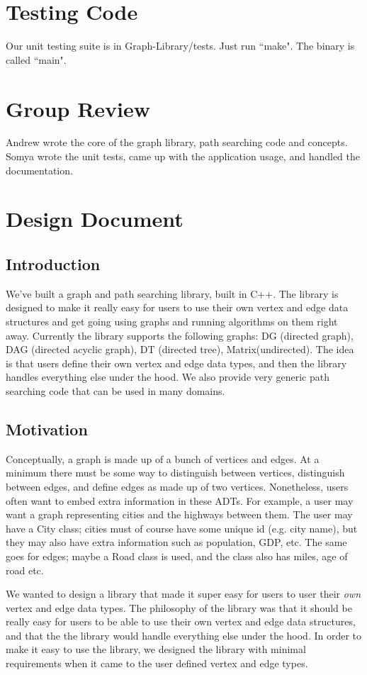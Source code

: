 \documentclass{article}
\begin{document}
\section{Testing Code}
Our unit testing suite is in Graph-Library/tests. Just run ``make". The binary is called ``main".

\section{Group Review}
Andrew wrote the core of the graph library, path searching code and concepts. Somya wrote the unit tests, came up with the application usage, and handled the documentation.

\section{Design Document}

\subsection{Introduction}
We've built a graph and path searching library, built in C++. The library is designed to make it really easy for users to use their own vertex and edge data structures and get going using graphs and running algorithms on them right away. Currently the library supports the following graphs: DG (directed graph), DAG (directed acyclic graph), DT (directed tree), Matrix(undirected). The idea is that users define their own vertex and edge data types, and then the library handles everything else under the hood. We also provide very generic path searching code that can be used in many domains. 

\subsection{Motivation}
Conceptually, a graph is made up of a bunch of vertices and edges. At a minimum there must be some way to distinguish between vertices, distinguish between edges, and define edges as made up of two vertices. Nonetheless, users often want to embed extra information in these ADTs. For example, a user may want a graph representing cities and the highways between them. The user may have a City class; cities must of course have some unique id (e.g. city name), but they may also have extra information such as population, GDP, etc. The same goes for edges; maybe a Road class is used, and the class also has miles, age of road etc. 
\par
We wanted to design a library that made it super easy for users to user their \emph{own} vertex and edge data types.
The philosophy of the library was that it should be really easy for users to be able to use their own vertex and edge data structures, and that the the library would handle everything else under the hood. In order to make it easy to use the library, we designed the library with minimal requirements when it came to the user defined vertex and edge types. 
\end{document}
